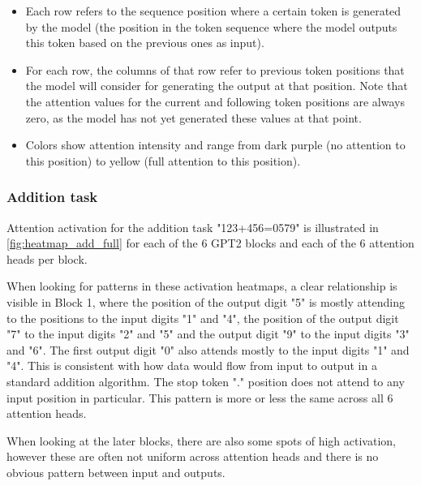 \begin{itemize}
	\item Each row refers to the sequence position where a certain token is generated by the model (the position in the token sequence where the model outputs this token based on the previous ones as input).
	
	\item For each row, the columns of that row refer to previous token positions that the model will consider for generating the output at that position. Note that the attention values for the current and following token positions are always zero, as the model has not yet generated these values at that point.
	
	\item Colors show attention intensity and range from dark purple (no attention to this position) to yellow (full attention to this position).
\end{itemize}

\subsubsection{Addition task}


Attention activation for the addition task "123+456=0579" is illustrated in \cref{fig:heatmap_add_full} for each of the 6 GPT2 blocks and each of the 6 attention heads per block.

When looking for patterns in these activation heatmaps, a clear relationship is visible in Block 1, where the position of the output digit "5" is mostly attending to the positions to the input digits "1" and "4", the position of the output digit "7" to the input digits "2" and "5" and the output digit "9" to the input digits "3" and "6". The first output digit "0" also attends mostly to the input digits "1" and "4". This is consistent with how data would flow from input to output in a standard addition algorithm. The stop token "." position does not attend to any input position in particular.
This pattern is more or less the same across all 6 attention heads.

When looking at the later blocks, there are also some spots of high activation, however these are often not uniform across attention heads and there is no obvious pattern between input and outputs.

